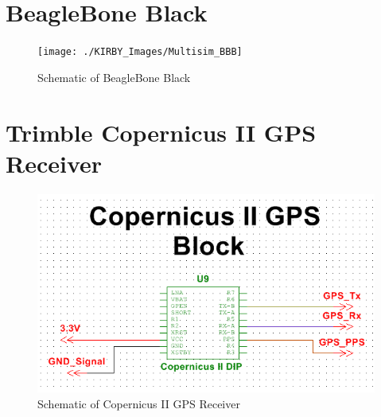 
\section{BeagleBone Black}
\begin{figure}[H]
\centering
\texttt{[image: ./KIRBY\_Images/Multisim\_BBB]}
\caption{Schematic of BeagleBone Black}
\label{fig:Schematic_BBB}
\end{figure}

\section{Trimble Copernicus II GPS Receiver}
\begin{figure}[H]
\centering
\includegraphics[width=\textwidth,height=\textheight,keepaspectratio]{./KIRBY_Images/Multisim_GPS}
\caption{Schematic of Copernicus II GPS Receiver}
\label{fig:Schematic_Copernicus}
\end{figure}

